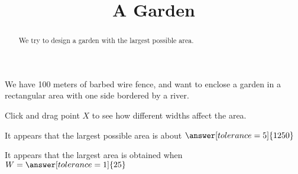\documentclass{ximera}
\title{A Garden}
\begin{document}
\begin{abstract}
We try to design a garden with the largest possible area.
\end{abstract}

We have 100 meters of barbed wire fence, and want to enclose a garden in a rectangular area with one side bordered by a river.

\begin{exploration}
Click and drag point $X$ to see how different widths affect the area.

\end{exploration}

\begin{problem}
It appears that the largest possible area is about $\answer[tolerance=5]{1250}$
\end{problem}

\begin{problem}
It appears that the largest area is obtained when $W = \answer[tolerance=1]{25}$
\end{problem}
\end{document}
